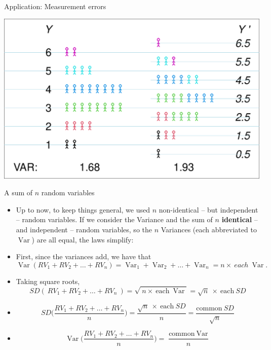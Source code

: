 \documentclass[10pt,handout]{beamer}\usepackage[]{graphicx}\usepackage[]{color}
\makeatletter
\def\maxwidth{ %
  \ifdim\Gin@nat@width>\linewidth
    \linewidth
  \else
    \Gin@nat@width
  \fi
}
\newenvironment{knitrout}{}{} %
\newcommand{\Var}{\operatorname{Var}}
\makeatother
\begin{document}
\begin{frame}[fragile]{Application: Measurement errors}
	
\begin{knitrout}\tiny
{}\color{fgcolor}

{\centering \includegraphics[width=\maxwidth]{figure/unnamed-chunk-11-1} 

}


\end{knitrout}
	
\end{frame}


\begin{frame}[fragile]{A sum of $n$ random variables}
	
	\begin{itemize}
		\setlength{\itemsep}{10pt}		
	\item Up to now, to keep things general, we used $n$ non-identical -- but independent -- random variables. If we
	consider the Variance and the sum of $n$ \textbf{identical} -- and independent -- random variables, so the $n$ Variances (each abbreviated to $\Var$) are all equal, the laws simplify:
	
	\item First, since the variances add, we have that	
	$$ \Var(RV_1 + RV_2 + \dots + RV_n) = \Var_1 + \Var_2 + \dots + \Var_n = n \times \ each \ \Var.$$
	
\item Taking square roots,	
	$$ SD( \ RV_1 + RV_2 + \dots + RV_n \ ) = \sqrt{ \ n \times \ \textrm{each} \ \Var} = \sqrt{n} \ \times \ \textrm{each} \ SD$$
	
	\pause

	\item $$ SD\bigg(\frac{RV_1 + RV_2 + \dots + RV_n}{n}\bigg) = \frac{\sqrt{n} \ \times \ \textrm{each} \ SD}{n} = \frac{\textrm{common} \ SD}{\sqrt{n}} $$
	
	\item $$ \Var\bigg(\frac{RV_1 + RV_2 + \dots + RV_n}{n}\bigg) = \frac{\textrm{common} \ \Var}{n} $$
	

		 
\end{itemize}

\end{frame}
\end{document}
